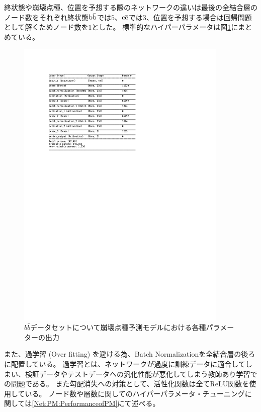 終状態や崩壊点種、位置を予想する際のネットワークの違いは最後の全結合層のノード数をそれぞれ終状態$\rm b\bar{b}$では$5$、$\rm c\bar{c}$では$3$、位置を予想する場合は回帰問題として解くためノード数を$1$とした。
標準的なハイパーパラメータは図\ref{3-3-1-2PairModelSummary}にまとめている。

\begin{figure}[h]
 \centering
 \includegraphics[trim = 75 500 125 0, width=0.9\textwidth]{Figure/3Networks/3-3-1-2PairModelSummary.png}
 \caption{$b\bar{b}$データセットについて崩壊点種予測モデルにおける各種パラメーターの出力}
 \label{3-3-1-2PairModelSummary}
\end{figure}

また、過学習 (Over fitting) を避ける為、Batch Normalization\cite{BatchNormalizationpaper}を全結合層の後ろに配置している。
過学習とは、ネットワークが過度に訓練データに適合してしまい、検証データやテストデータへの汎化性能が悪化してしまう教師あり学習での問題である。
また勾配消失への対策として、活性化関数は全てReLU関数を使用している。
ノード数や層数に関してのハイパーパラメータ・チューニングに関しては\ref{Net:PM:PerformanceofPM}にて述べる。


